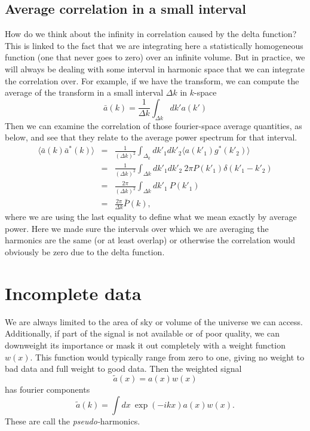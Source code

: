 \subsection{Average correlation in a small interval}
How do we think about the infinity in correlation caused by the delta function?  This is linked to the fact that we are integrating here a statistically homogeneous function (one that never goes to zero) over an infinite volume.  But in practice, we will always be dealing with some interval in harmonic space that we can integrate the correlation over.  For example, if we have the transform, we can compute the average of the transform in a small interval $\Delta k$ in $k$-space
\begin{equation}
  \bar a(k) = \frac{1}{\Delta k} \int_{\Delta k} dk' a(k')
\end{equation}
Then we can examine the correlation of those fourier-space average quantities, as below, and see that they relate to the average power spectrum for that interval. 
\begin{eqnarray}
  \langle \bar a(k)  \bar a^*(k) \rangle &=& \frac{1}{(\Delta k)^2} \int_{\Delta_k} dk'_1 dk'_2 \langle a(k'_1) g^*(k'_2) \rangle \\
  &=& \frac{1}{(\Delta k)^2} \int_{\Delta k} dk'_1 dk'_2 \ 2\pi P(k'_1) \delta(k'_1 - k'_2) \\
  &=& \frac{2\pi}{(\Delta k)^2}  \int_{\Delta k} dk'_1 \  P(k'_1) \\
  &=& \frac{2\pi}{\Delta k}  \bar P(k),
\end{eqnarray}
where we are using the last equality to define what we mean exactly by average power.  Here we made sure the intervals over which we are averaging the harmonics are the same (or at least overlap) or otherwise the correlation would obviously be zero due to the delta function.


\section{Incomplete data}

We are always limited to the area of sky or volume of the universe we can access.  Additionally, if part of the signal is not available or of poor quality, we can downweight its importance or mask it out completely with a weight function $w(x)$.  This function would typically range from zero to one, giving no weight to bad data and full weight to good data.  Then the weighted signal
\begin{equation}\tilde a(x) = a(x) w(x)\end{equation}
has fourier components
\begin{equation}
  \tilde a(k) = \int dx\  \exp(-i k x) a(x) w(x).
\end{equation}
These are call the \textit{pseudo-}harmonics.

